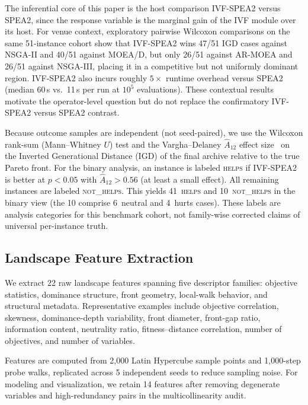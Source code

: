 \documentclass[runningheads]{llncs}
\begin{document}
The inferential core of this paper is the host comparison IVF-SPEA2 versus
SPEA2, since the response variable is the marginal gain of the IVF module
over its host. For venue context, exploratory pairwise Wilcoxon comparisons
on the same 51-instance cohort show that IVF-SPEA2 wins 47/51 IGD cases
against NSGA-II and 40/51 against MOEA/D, but only 26/51 against AR-MOEA
and 26/51 against NSGA-III, placing it in a competitive but not uniformly
dominant region. IVF-SPEA2 also incurs roughly $5{\times}$ runtime overhead
versus SPEA2 (median 60\,s vs.\ 11\,s per run at $10^5$ evaluations).
These contextual results motivate the operator-level question but do not
replace the confirmatory IVF-SPEA2 versus SPEA2 contrast.

Because outcome samples are independent (not seed-paired), we use the
Wilcoxon rank-sum (Mann--Whitney $U$) test and the Vargha--Delaney
$\hat{A}_{12}$ effect size~\cite{arcuri2011practical,vargha2000critique} on
the Inverted Generational Distance (IGD) of the final archive relative to
the true Pareto front.
For the binary analysis, an instance is labeled \textsc{helps} if IVF-SPEA2 is
better at $p < 0.05$ with $\hat{A}_{12} > 0.56$ (at least a small effect). All
remaining instances are labeled \textsc{not\_helps}. This yields
41~\textsc{helps} and 10~\textsc{not\_helps} in the binary view (the 10
comprise 6~neutral and 4~hurts cases). These labels are analysis categories
for this benchmark cohort, not family-wise corrected claims of universal
per-instance truth.

\subsection{Landscape Feature Extraction}
\label{sec:fla_features}

We extract 22 raw landscape features spanning five descriptor families:
objective statistics, dominance structure, front geometry, local-walk
behavior, and structural metadata. Representative examples include
objective correlation, skewness, dominance-depth variability,
front diameter, front-gap ratio, information content, neutrality ratio,
fitness--distance correlation, number of objectives, and number of
variables.

Features are computed from 2{,}000 Latin Hypercube sample points and
1{,}000-step probe walks, replicated across 5 independent seeds to reduce
sampling noise. For modeling and visualization, we retain 14 features after
removing degenerate variables and high-redundancy pairs in the
multicollinearity audit.
\end{document}
